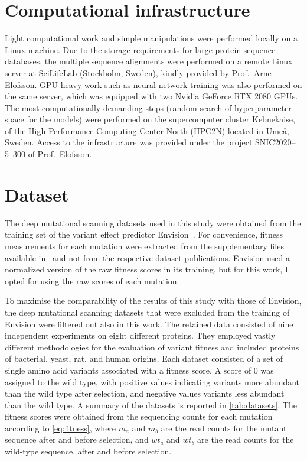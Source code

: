 \section{Computational infrastructure}
Light computational work and simple manipulations were performed locally on a Linux machine.
Due to the storage requirements for large protein sequence databases, the multiple sequence alignments were performed on a remote Linux server at SciLifeLab (Stockholm, Sweden), kindly provided by Prof.~Arne Elofsson.
GPU-heavy work such as neural network training was also performed on the same server, which was equipped with two Nvidia GeForce RTX 2080 GPUs.
The most computationally demanding steps (random search of hyperparameter space for the models) were performed on the supercomputer cluster Kebnekaise, of the High-Performance Computing Center North (HPC2N) located in Umeå, Sweden.
Access to the infrastructure was provided under the project SNIC2020--5--300 of Prof.~Elofsson.

\section{Dataset}\label{sec:mm_dataset}
The deep mutational scanning datasets used in this study were obtained from the training set of the variant effect predictor Envision~\parencite{Gray2018}.
For convenience, fitness measurements for each mutation were extracted from the supplementary files available in~\cite{Gray2018} and not from the respective dataset publications.
Envision used a normalized version of the raw fitness scores in its training, but for this work, I opted for using the raw scores of each mutation.

To maximise the comparability of the results of this study with those of Envision, the deep mutational scanning datasets that were excluded from the training of Envision were filtered out also in this work.
The retained data consisted of nine independent experiments on eight different proteins.
They employed vastly different methodologies for the evaluation of variant fitness and included proteins of bacterial, yeast, rat, and human origins.
Each dataset consisted of a set of single amino acid variants associated with a fitness score.
A score of \num{0} was assigned to the wild type, with positive values indicating variants more abundant than the wild type after selection, and negative values variants less abundant than the wild type.
A summary of the datasets is reported in \cref{tab:datasets}.
The fitness scores were obtained from the sequencing counts for each mutation according to \cref{eq:fitness}, where $m_a$ and $m_b$ are the read counts for the mutant sequence after and before selection, and  $wt_a$ and $wt_b$ are the read counts for the wild-type sequence, after and before selection.

